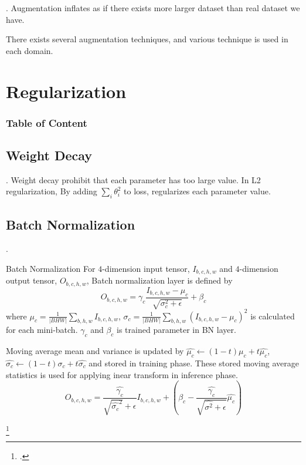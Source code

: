 \documentclass[8pt]{beamer}
\newcommand{\abs}[1]{\left\lvert #1 \right\rvert}
\begin{document}
\begin{frame}{.}
    Augmentation inflates as if there exists more larger dataset than real dataset we have.

    There exists several augmentation techniques, and various technique is used in each domain.
\end{frame}

\section{Regularization}
\begingroup
    \begin{frame}
        \frametitle{Table of Content}
        \tableofcontents
    \end{frame}
\endgroup

\subsection{Weight Decay}
\begin{frame}{.}
    Weight decay prohibit that each parameter has too large value.
    In L2 regularization, By adding $\sum_i \theta_i^2$ to loss, regularizes each parameter value.
\end{frame}

\subsection{Batch Normalization}


\begin{frame}{.}

    \begin{block}{Batch Normalization}
        For $4$-dimension input tensor, $I_{b,c,h,w}$ and $4$-dimension output tensor, $O_{b,c,h,w}$, Batch normalization layer is defined by
        \[
            O_{b,c,h,w} = \gamma_c \frac{I_{b,c,h,w} - \mu_c}{\sqrt{\sigma^2_c + \epsilon}} + \beta_c
        \]
        where $\mu_c = \frac{1}{\abs{BHW} } \sum_{b,h,w} I_{b,c,h,w}$, $\sigma_c = \frac{1}{\abs{BHW}} \sum_{b,h,w} (I_{b,c,h,w} - \mu_c)^2$ is calculated for each mini-batch. $\gamma_c$ and $\beta_c$ is trained parameter in BN layer.

        \smallskip
        Moving average mean and variance is updated by $\hat{\mu_c} \leftarrow (1-t)\mu_c + t\hat{\mu_c}$, $\hat{\sigma_c} \leftarrow (1-t) \sigma_c + t \hat{\sigma_c}$ and stored in training phase. These stored moving average statistics is used for applying inear transform in inference phase.
        \[
            O_{b,c,h,w} = \frac{\hat{\gamma_c}}{\sqrt{\hat{\sigma_c}^2}+ \epsilon} I_{b,c,h,w} + \left(\beta_c  - \frac{\hat{\gamma_c}}{\sqrt{\hat{\sigma^2} + \epsilon}}\hat{\mu_c}\right)
        \]
    \end{block}


    \footcite{Understanding_Batch_Normalization_nips_2018,ioffe2015batch}
\end{frame}
\end{document}
